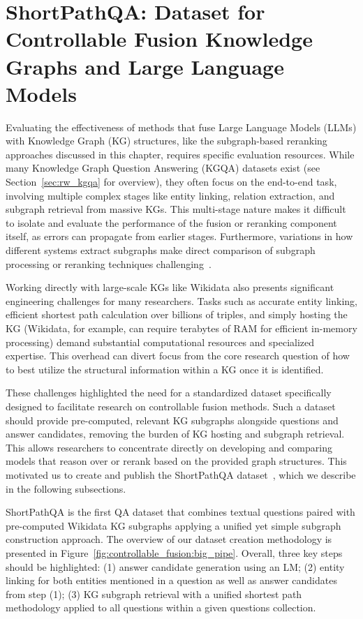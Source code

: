\section{ShortPathQA: Dataset for Controllable Fusion Knowledge Graphs and Large Language Models}
\label{sec:controllable_fusion:dataset}

Evaluating the effectiveness of methods that fuse Large Language Models (LLMs) with Knowledge Graph (KG) structures, like the subgraph-based reranking approaches discussed in this chapter, requires specific evaluation resources. While many Knowledge Graph Question Answering (KGQA) datasets exist (see Section~\ref{sec:rw_kgqa} for overview), they often focus on the end-to-end task, involving multiple complex stages like entity linking, relation extraction, and subgraph retrieval from massive KGs. This multi-stage nature makes it difficult to isolate and evaluate the performance of the fusion or reranking component itself, as errors can propagate from earlier stages. Furthermore, variations in how different systems extract subgraphs make direct comparison of subgraph processing or reranking techniques challenging~\cite{DBLP:conf/nldb/SalnikovSPQA25}.

Working directly with large-scale KGs like Wikidata also presents significant engineering challenges for many researchers. Tasks such as accurate entity linking, efficient shortest path calculation over billions of triples, and simply hosting the KG (Wikidata, for example, can require terabytes of RAM for efficient in-memory processing) demand substantial computational resources and specialized expertise. This overhead can divert focus from the core research question of how to best utilize the structural information within a KG once it is identified.

These challenges highlighted the need for a standardized dataset specifically designed to facilitate research on controllable fusion methods. Such a dataset should provide pre-computed, relevant KG subgraphs alongside questions and answer candidates, removing the burden of KG hosting and subgraph retrieval. This allows researchers to concentrate directly on developing and comparing models that reason over or rerank based on the provided graph structures. This motivated us to create and publish the ShortPathQA dataset~\cite{DBLP:conf/nldb/SalnikovSPQA25}, which we describe in the following subsections.

ShortPathQA is the first QA dataset that combines textual questions paired with pre-computed Wikidata KG subgraphs applying a unified yet simple subgraph construction approach. The overview of our dataset creation methodology is presented in Figure~\ref{fig:controllable_fusion:big_pipe}. Overall, three key steps should be highlighted: (1) answer candidate generation using an LM; (2) entity linking for both entities mentioned in a question as well as answer candidates from step (1); (3) KG subgraph retrieval with a unified shortest path methodology applied to all questions within a given questions collection.

